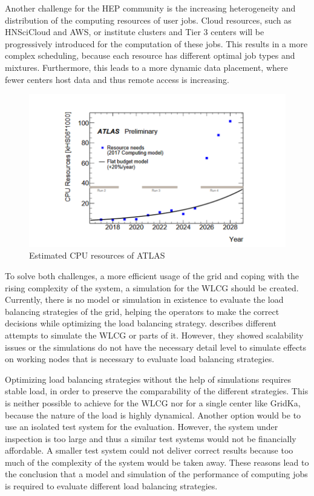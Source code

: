 \documentclass[a4paper]{jpconf}
\begin{document}
Another challenge for the HEP community is the increasing heterogeneity and distribution of the computing resources of user jobs. Cloud resources, such as HNSciCloud and AWS, or institute clusters and Tier 3 centers will be progressively introduced for the computation of these jobs. This results in a more complex scheduling, because each resource has different optimal job types and mixtures. Furthermore, this leads to a more dynamic data placement, where fewer centers host data and thus remote access is increasing.

\begin{figure}
	\centering
	\includegraphics[width=1.0\linewidth]{images/resources}
	\caption[]{Estimated CPU resources of ATLAS \cite{community}}
	\label{resources}
\end{figure}

To solve both challenges, a more efficient usage of the grid and coping with the rising complexity of the system, a simulation for the WLCG should be created.
Currently, there is no model or simulation in existence to evaluate the load balancing strategies of the grid, helping the operators to make the correct decisions while optimizing the load balancing strategy.
 describes different attempts to simulate the WLCG or parts of it. However, they showed scalability issues or the simulations do not have the necessary detail level to simulate effects on working nodes that is necessary to evaluate load balancing strategies.

Optimizing load balancing strategies without the help of simulations requires stable load, in order to preserve the comparability of the different strategies. This is neither possible to achieve for the WLCG nor for a single center like GridKa, because the nature of the load is highly dynamical. Another option would be to use an isolated test system for the evaluation. However, the system under inspection is too large and thus a similar test systems would not be financially affordable. A smaller test system could not deliver correct results because too much of the complexity of the system would be taken away.
These reasons lead to the conclusion that a model and simulation of the performance of computing jobs is required to evaluate different load balancing strategies.
\end{document}
